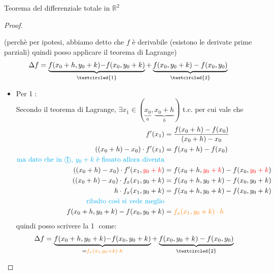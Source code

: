 \documentclass{article}  %
\begin{document}
\begin{theorem}{Teorema del differenziale totale in $\mathbb{R}^2$}
\begin{proof}
\begin{enumerate}
			      (perchè per ipotesi, abbiamo detto che $f$ è derivabile (esistono le derivate prime parziali) quindi posso applicare il teorema di Lagrange)
			      \begin{align*}
				      \Delta f & =\underbrace{f(x_0+h, y_0+k){-f(x_0, y_0+k)}}_{\textcircled{1}} + \underbrace{{f(x_0, y_0+k)} -f(x_0,y_0)}_{\textcircled{2}}
			      \end{align*}
			      \begin{itemize}
				      \item Per \textcircled{1}: \\
				            Secondo il teorema di Lagrange, $\exists x_1 \in (\underbrace{x_0}_{a}, \underbrace{x_0+h}_{b})$ t.c. per cui vale che
				            \begin{align*}
					            f'(x_1)                                             & = \frac{f(x_0+h)-f(x_0)}{(x_0+h)-x_0}                             \\
					            ((x_0+h)-x_0) \cdot f'(x_1)                         & = f(x_0+h)-f(x_0)                                                 \\
					            \textcolor{cyan}{\text{ma dato che in \textcircled{1}, $y_0+k$ è fissato allora diventa}}                               \\
					            ((x_0+h)-x_0) \cdot f'(x_1, \textcolor{red}{y_0+k}) & = f(x_0+h, \textcolor{red}{y_0+k})-f(x_0, \textcolor{red}{y_0+k}) \\
					            ((x_0+h)-x_0) \cdot f_x(x_1, {y_0+k})               & = f(x_0+h, {y_0+k})-f(x_0, {y_0+k})                               \\
					            h \cdot f_x(x_1, {y_0+k})                           & = f(x_0+h, {y_0+k})-f(x_0, {y_0+k})                               \\
					            \textcolor{cyan}{\text{ribalto così si vede meglio}}                                                                    \\
					            f(x_0+h, {y_0+k})-f(x_0, {y_0+k})                   & = \textcolor{orange}{f_x(x_1, {y_0+k}) \cdot h}
				            \end{align*}
				            quindi posso scrivere la \textcircled{1} come:
				            \begin{align*}
					            \Delta f & =\underbrace{f(x_0+h, y_0+k){-f(x_0, y_0+k)}}_{= \textcolor{orange}{f_x(x_1, {y_0+k}) \cdot h}} + \underbrace{{f(x_0, y_0+k)} -f(x_0,y_0)}_{\textcircled{2}}
				            \end{align*}

\end{itemize}
\end{enumerate}
\end{proof}
\end{theorem}
\end{document}
